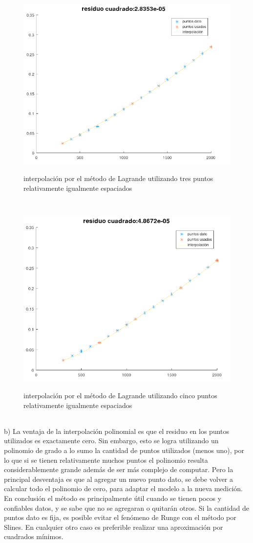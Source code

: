 \documentclass{article}
\begin{document}
\begin{figure}[H]
    \centering
    \includegraphics[width=0.7\linewidth]{3.png}
    \label{fig:enter-label}
    \caption{interpolación por el método de Lagrande utilizando tres puntos relativamente igualmente espaciados}
\end{figure}\\

\begin{figure}[H]
    \centering
    \includegraphics[width=0.7\linewidth]{5.png}
    \label{fig:enter-label}
    \caption{interpolación por el método de Lagrande utilizando cinco puntos relativamente igualmente espaciados}
\end{figure}\\

b)
La ventaja de la interpolación polinomial es que el residuo en los puntos utilizados es exactamente cero. Sin embargo, esto se logra utilizando un polinomio de grado a lo sumo la cantidad de puntos utilizados (menos uno), por lo que si se tienen relativamente muchos puntos el polinomio resulta considerablemente grande además de ser más complejo de computar. Pero la principal desventaja es que al agregar un nuevo punto dato, se debe volver a calcular todo el polinomio de cero, para adaptar el modelo a la nueva medición. En conclusión el método es principalmente útil cuando se tienen pocos y confiables datos, y se sabe que no se agregaran o quitarán otros. Si la cantidad de puntos dato es fija, es posible evitar el fenómeno de Runge con el método por Slines. En cualquier otro caso es preferible realizar una aproximación por cuadrados mínimos. \\
\end{document}
